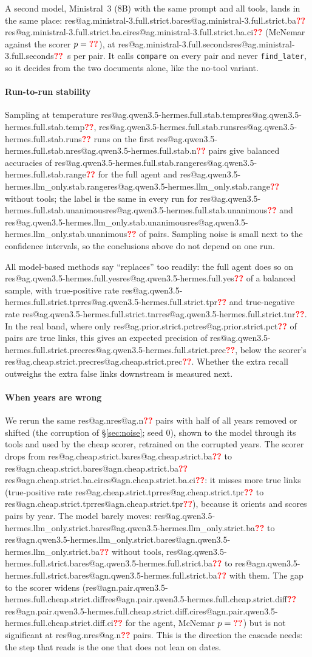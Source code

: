 \documentclass[11pt,a4paper]{article}
\makeatletter
\newcommand{\res}[1]{\ifcsname res@#1\endcsname\csname res@#1\endcsname\else\textcolor{red}{\textbf{??}}\fi}
\newcommand{\code}[1]{\texttt{\small #1}}
\makeatother
\begin{document}
A second model, Ministral~3 (8B) with the same prompt and all tools, lands in the
same place: \res{ag.ministral-3.full.strict.ba} \res{ag.ministral-3.full.strict.ba.ci}
(McNemar against the scorer
$p=\res{ag.pair.ministral-3.full.cheap.strict.p}$), at
\res{ag.ministral-3.full.seconds}~s per pair. It calls \code{compare} on every pair
and never \code{find\_later}, so it decides from the two documents alone, like the
no-tool variant.

\paragraph{Run-to-run stability} Sampling at temperature
\res{ag.qwen3.5-hermes.full.stab.temp}, \res{ag.qwen3.5-hermes.full.stab.runs} runs
on the first \res{ag.qwen3.5-hermes.full.stab.n} pairs give balanced accuracies of
\res{ag.qwen3.5-hermes.full.stab.range} for the full agent and
\res{ag.qwen3.5-hermes.llm_only.stab.range} without tools; the label is the same in
every run for \res{ag.qwen3.5-hermes.full.stab.unanimous} and
\res{ag.qwen3.5-hermes.llm_only.stab.unanimous} of pairs. Sampling noise is small
next to the confidence intervals, so the conclusions above do not depend on one run.

All model-based methods say ``replaces'' too readily: the full agent does so on
\res{ag.qwen3.5-hermes.full.yes} of a balanced sample, with true-positive rate
\res{ag.qwen3.5-hermes.full.strict.tpr} and true-negative rate
\res{ag.qwen3.5-hermes.full.strict.tnr}. In the real band, where only
\res{ag.prior.strict.pct} of pairs are true links, this gives an expected precision
of \res{ag.qwen3.5-hermes.full.strict.prec}, below the scorer's
\res{ag.cheap.strict.prec}. Whether the extra recall outweighs the extra false
links downstream is measured next.

\paragraph{When years are wrong} We rerun the same \res{ag.n} pairs with half of all
years removed or shifted (the corruption of §\ref{sec:noise}; seed 0), shown to the
model through its tools and used by the cheap scorer, retrained on the corrupted
years. The scorer drops from \res{ag.cheap.strict.ba} to \res{agn.cheap.strict.ba}
\res{agn.cheap.strict.ba.ci}: it misses more true links (true-positive rate
\res{ag.cheap.strict.tpr} to \res{agn.cheap.strict.tpr}), because it orients and
scores pairs by year. The model barely moves: \res{ag.qwen3.5-hermes.llm_only.strict.ba}
to \res{agn.qwen3.5-hermes.llm_only.strict.ba} without tools,
\res{ag.qwen3.5-hermes.full.strict.ba} to \res{agn.qwen3.5-hermes.full.strict.ba}
with them. The gap to the scorer widens (\res{agn.pair.qwen3.5-hermes.full.cheap.strict.diff}
\res{agn.pair.qwen3.5-hermes.full.cheap.strict.diff.ci} for the agent, McNemar
$p=\res{agn.pair.qwen3.5-hermes.full.cheap.strict.p}$) but is not significant at
\res{ag.n} pairs. This is the direction the cascade needs: the step that reads is the
one that does not lean on dates.
\end{document}
